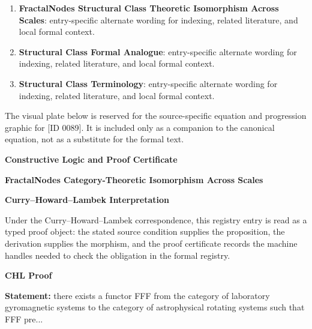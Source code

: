 \begingroup\footnotesize\sloppy
\begin{enumerate}[leftmargin=1.35em,itemsep=1pt,topsep=1pt,parsep=0pt]
\item \textbf{FractalNodes Structural Class Theoretic Isomorphism Across Scales}: entry-specific alternate wording for indexing, related literature, and local formal context.
\item \textbf{Structural Class Formal Analogue}: entry-specific alternate wording for indexing, related literature, and local formal context.
\item \textbf{Structural Class Terminology}: entry-specific alternate wording for indexing, related literature, and local formal context.
\end{enumerate}
\endgroup

\begingroup\footnotesize\sloppy
The visual plate below is reserved for the source-specific equation and progression graphic for [ID 0089]. It is included only as a companion to the canonical equation, not as a substitute for the formal text.
\par\endgroup
\ifTZPDarkEdition
{}
\fi

\clearpage
\begingroup\tzpsupportsetup
\noindent\textbf{\fontsize{10.8pt}{12.8pt}\selectfont [ID 0089] Constructive Logic and Proof Certificate}\par
\noindent\textbf{\fontsize{10pt}{12pt}\selectfont FractalNodes Category-Theoretic Isomorphism Across Scales}\par
\vspace{0.45em}
\begingroup
\footnotesize
\setlength{\parskip}{0.22em}
\setlength{\parindent}{0pt}
\noindent\textbf{Curry--Howard--Lambek Interpretation}\par
Under the Curry--Howard--Lambek correspondence, this registry entry is read as a typed proof
object: the stated source condition supplies the proposition, the derivation supplies the
morphism, and the proof certificate records the machine handles needed to check the obligation
in the formal registry.

\vspace{0.45em}
\noindent\textbf{CHL Proof}\par
\textbf{Statement:} there exists a functor FFF from the category of laboratory gyromagnetic systems to the
category of astrophysical rotating systems such that FFF pre...

